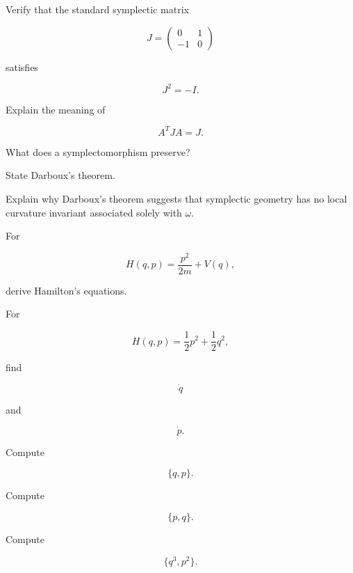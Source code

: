 \begin{exercise}[2]
Verify that the standard symplectic matrix

\[
J=
\begin{pmatrix}
0&1\\
-1&0
\end{pmatrix}
\]

satisfies

\[
J^2=-I.
\]
\end{exercise}

\begin{exercise}[2]
Explain the meaning of

\[
A^TJA=J.
\]
\end{exercise}

\begin{exercise}[2]
What does a symplectomorphism preserve?
\end{exercise}

\begin{exercise}[2]
State Darboux's theorem.
\end{exercise}

\begin{exercise}[2]
Explain why Darboux's theorem suggests that symplectic geometry has no local
curvature invariant associated solely with \(\omega\).
\end{exercise}

\begin{exercise}[2]
For

\[
H(q,p)=\frac{p^2}{2m}+V(q),
\]

derive Hamilton's equations.
\end{exercise}

\begin{exercise}[2]
For

\[
H(q,p)=\frac12p^2+\frac12q^2,
\]

find

\[
\dot q
\]

and

\[
\dot p.
\]
\end{exercise}

\begin{exercise}[2]
Compute

\[
\{q,p\}.
\]
\end{exercise}

\begin{exercise}[2]
Compute

\[
\{p,q\}.
\]
\end{exercise}

\begin{exercise}[2]
Compute

\[
\{q^3,p^2\}.
\]
\end{exercise}

